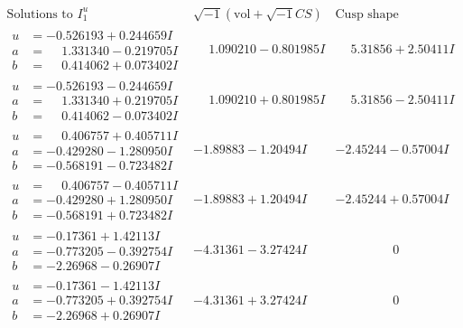 \documentclass[1p]{elsarticle_modified}
\theoremstyle{definition}
\newcommand{\I}{\sqrt{-1}}
\begin{document}
$$\begin{array}{c|c|c}
 \end{array}$$\newpage$$\begin{array}{c|c|c}  
\text{Solutions to }I^u_{1}& \I (\text{vol} + \sqrt{-1}CS) & \text{Cusp shape}\\
 \hline 
\begin{aligned}
u &= -0.526193 + 0.244659 I \\
a &= \phantom{-}1.331340 - 0.219705 I \\
b &= \phantom{-}0.414062 + 0.073402 I\end{aligned}
 & \phantom{-}1.090210 - 0.801985 I & \phantom{-}5.31856 + 2.50411 I \\ \hline\begin{aligned}
u &= -0.526193 - 0.244659 I \\
a &= \phantom{-}1.331340 + 0.219705 I \\
b &= \phantom{-}0.414062 - 0.073402 I\end{aligned}
 & \phantom{-}1.090210 + 0.801985 I & \phantom{-}5.31856 - 2.50411 I \\ \hline\begin{aligned}
u &= \phantom{-}0.406757 + 0.405711 I \\
a &= -0.429280 - 1.280950 I \\
b &= -0.568191 - 0.723482 I\end{aligned}
 & -1.89883 - 1.20494 I & -2.45244 - 0.57004 I \\ \hline\begin{aligned}
u &= \phantom{-}0.406757 - 0.405711 I \\
a &= -0.429280 + 1.280950 I \\
b &= -0.568191 + 0.723482 I\end{aligned}
 & -1.89883 + 1.20494 I & -2.45244 + 0.57004 I \\ \hline\begin{aligned}
u &= -0.17361 + 1.42113 I \\
a &= -0.773205 - 0.392754 I \\
b &= -2.26968 - 0.26907 I\end{aligned}
 & -4.31361 - 3.27424 I & \phantom{-0.000000 } 0 \\ \hline\begin{aligned}
u &= -0.17361 - 1.42113 I \\
a &= -0.773205 + 0.392754 I \\
b &= -2.26968 + 0.26907 I\end{aligned}
 & -4.31361 + 3.27424 I & \phantom{-0.000000 } 0 \\ \hline\begin{aligned}

\end{aligned}
\end{array}$$
\end{document}
